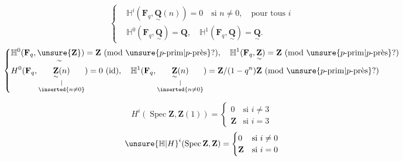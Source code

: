 \[
\left\{\begin{aligned}
&\mathbb H^i(\mathbf F_q,\underset{\sim}{\mathbf Q}(n))=0\quad\text{si }n\neq0,\quad\text{pour tous }i\\
&\mathbb H^0(\mathbf F_q,\underset{\sim}{\mathbf Q})=\mathbf Q,\quad\mathbb H^1(\mathbf F_q,\underset{\sim}{\mathbf Q})=\underset{\sim}{\mathbf Q}.
\end{aligned}\right.
\]
\[
\left\{\begin{aligned}
&\mathbb H^0(\mathbf F_q,\underset{\sim}{\unsure{\mathbf Z}})=\mathbf Z\ (\text{mod }\unsure{p\text{-prim}|p\text{-près}}?),\quad
\mathbb H^1(\mathbf F_q,\underset{\sim}{\mathbf Z})=\mathbf Z\ (\text{mod }\unsure{p\text{-prim}|p\text{-près}}?)\\
&H^0(\mathbf F_q,\underset{\substack{\vert\\\inserted{n\neq0}}}{\underset{\sim}{\mathbf Z}(n)})=0\ (\text{id}),\quad
\mathbb H^1(\mathbf F_q,\underset{\substack{\vert\\\inserted{n\neq0}}}{\underset{\sim}{\mathbf Z}(n)})=\mathbf Z/(1-q^n)\mathbf Z\ (\text{mod }\unsure{p\text{-prim}|p\text{-près}}?)
\end{aligned}\right.
\]


\[
H^i(\operatorname{Spec}\mathbf Z,\mathbf Z(1))=\begin{cases}0&\text{si }i\neq3\\\mathbf Z&\text{si }i=3\end{cases}
\]
\[
\unsure{\mathbb H|H}^i(\operatorname{Spec}\mathbf Z,\mathbf Z)=\begin{cases}0&\text{si }i\neq0\\\mathbf Z&\text{si }i=0\end{cases}
\]

